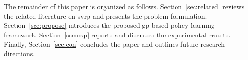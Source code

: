 \documentclass[pdflatex]{sn-jnl}
\begin{document}
The remainder of this paper is organized as follows.
Section~\ref{sec:related} reviews the related literature on \gls{svrp} and presents the problem formulation. Section~\ref{sec:propose} introduces the proposed \gls{gp}-based policy-learning framework. Section~\ref{sec:exp} reports and discusses the experimental results. Finally, Section~\ref{sec:con} concludes the paper and outlines future research directions.


\end{document}
